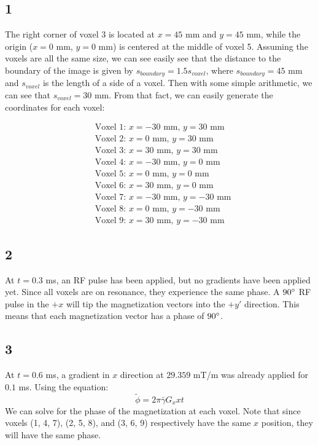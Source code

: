 \documentclass{article}
\begin{document}
\subsection*{1}

The right corner of voxel 3 is located at $x = 45$ mm
and $y = 45$ mm, while the origin ($x = 0$ mm, $y = 0$ mm) is
centered at the middle of voxel 5. Assuming the voxels are all
the same size, we can see easily see that the distance to the boundary
of the image is given by $s_{boundary} = 1.5s_{voxel}$, where $s_{boundary} = 45$
mm and $s_{voxel}$ is the length of a side of a voxel. Then with
some simple arithmetic, we can see that $s_{voxel} = 30$ mm. From that fact,
we can easily generate the coordinates for each voxel:

\begin{align*}
    &\textrm{Voxel 1: } x = -30 \textrm{ mm, } y = 30 \textrm{ mm}\\
    &\textrm{Voxel 2: } x = 0 \textrm{ mm, } y = 30 \textrm{ mm}\\
    &\textrm{Voxel 3: } x = 30 \textrm{ mm, } y = 30 \textrm{ mm}\\
    &\textrm{Voxel 4: } x = -30 \textrm{ mm, } y = 0 \textrm{ mm}\\
    &\textrm{Voxel 5: } x = 0 \textrm{ mm, } y = 0 \textrm{ mm} \\
    &\textrm{Voxel 6: } x = 30 \textrm{ mm, } y = 0 \textrm{ mm}\\
    &\textrm{Voxel 7: } x = -30 \textrm{ mm, } y = -30 \textrm{ mm}\\
    &\textrm{Voxel 8: } x = 0 \textrm{ mm, } y = -30 \textrm{ mm}\\
    &\textrm{Voxel 9: } x = 30 \textrm{ mm, } y = -30 \textrm{ mm}
\end{align*}

\subsection*{2}
At $t = 0.3$ ms, an RF pulse has been applied, but no gradients have been applied yet. Since all voxels are on
resonance, they experience the same phase. A $90\degree$ RF pulse in the $+x$ will tip the magnetization vectors into
the $+y'$ direction. This means that each magnetization vector has a phase of $90\degree$.

\subsection*{3}
At $t = 0.6$ ms, a gradient in $x$ direction at $29.359$ mT/m was already applied for $0.1$ ms. Using
the equation: \[ \tilde{\phi} = 2\pi \bar{\gamma}G_{x}xt \]
We can solve for the phase of the magnetization at each voxel. Note that since
voxels (1, 4, 7), (2, 5, 8), and (3, 6, 9) respectively have the
same $x$ position, they will have the same phase. 
\end{document}
